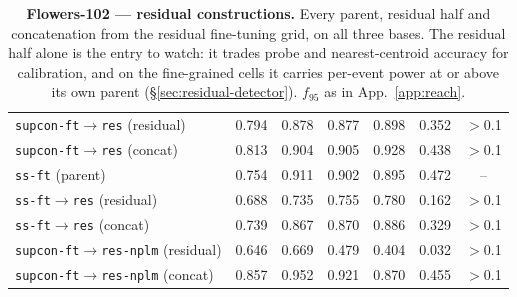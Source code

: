 \documentclass{article}
\begin{document}
\begin{table}[p]
\begin{tabular}{lcccccc}
\texttt{supcon-ft$\to$res} (residual) & 0.794 & 0.878 & 0.877 & 0.898 & 0.352 & $>$0.1 \\
\texttt{supcon-ft$\to$res} (concat) & 0.813 & 0.904 & 0.905 & 0.928 & 0.438 & $>$0.1 \\
\texttt{ss-ft} (parent) & 0.754 & 0.911 & 0.902 & 0.895 & 0.472 & -- \\
\texttt{ss-ft$\to$res} (residual) & 0.688 & 0.735 & 0.755 & 0.780 & 0.162 & $>$0.1 \\
\texttt{ss-ft$\to$res} (concat) & 0.739 & 0.867 & 0.870 & 0.886 & 0.329 & $>$0.1 \\
\texttt{supcon-ft$\to$res-nplm} (residual) & 0.646 & 0.669 & 0.479 & 0.404 & 0.032 & $>$0.1 \\
\texttt{supcon-ft$\to$res-nplm} (concat) & 0.857 & 0.952 & 0.921 & 0.870 & 0.455 & $>$0.1 \\
\bottomrule
\end{tabular}
\caption{\textbf{Flowers-102 --- residual constructions.} Every parent, residual half
and concatenation from the residual fine-tuning grid, on all three bases.
The residual half alone is the entry to watch: it trades probe and
nearest-centroid accuracy for calibration, and on the fine-grained cells it
carries per-event power at or above its own parent
(\S\ref{sec:residual-detector}). $f_{95}$ as in App.~\ref{app:reach}.}
\label{tab:res-flowers}
\end{table}
\end{document}
